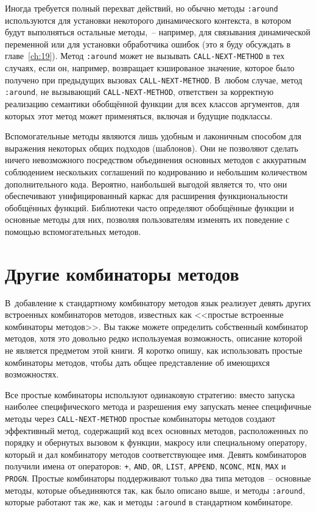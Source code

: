 Иногда требуется полный перехват действий, но обычно методы \lstinline{:around} используются
для установки некоторого динамического контекста, в котором будут выполняться остальные
методы,~-- например, для связывания динамической переменной или для установки обработчика
ошибок (это я буду обсуждать в главе~\ref{ch:19}).  Метод \lstinline{:around} может не вызывать
\lstinline{CALL-NEXT-METHOD} в тех случаях, если он, например, возвращает кэшированое значение,
которое было получено при предыдущих вызовах \lstinline{CALL-NEXT-METHOD}.  В~любом случае,
метод \lstinline{:around}, не вызывающий \lstinline{CALL-NEXT-METHOD}, ответствен за корректную
реа\-ли\-за\-цию семантики обобщённой функции для всех классов аргументов, для которых этот
метод может применяться, включая и будущие подклассы.

Вспомогательные методы являются лишь удобным и лаконичным способом для выражения некоторых
общих подходов (шаблонов).  Они не позволяют сделать ничего невозможного посредством
объединения основных методов с аккуратным соблюдением нескольких соглашений по кодированию
и небольшим количеством дополнительного кода. Вероятно, наибольшей выгодой является то,
что они обеспечивают унифицированный каркас для расширения функциональности обобщённых
функций.  Библиотеки часто определяют обобщённые функции и основные методы для них,
позволяя пользователям изменять их поведение с помощью вспомогательных методов.

\section{Другие комбинаторы методов}

В~добавление к стандартному комбинатору методов язык реализует девять других встроенных
комбинаторов методов, известных как <<простые встроенные комбинаторы методов>>.  Вы также
можете определить собственный комбинатор методов, хотя это довольно редко используемая
возможность, описание которой не является предметом этой книги.  Я коротко опишу, как
использовать простые комбинаторы методов, чтобы дать общее представление об имеющихся
возможностях.

Все простые комбинаторы используют одинаковую стратегию: вместо запуска наиболее
специфического метода и разрешения ему запускать менее специфичные методы через
\lstinline{CALL-NEXT-METHOD} простые комбинаторы методов создают эффективный метод, содержащий
код всех основных методов, расположенных по порядку и обернутых вызовом к функции,
макросу или специальному оператору, который и дал комбинатору методов соответствующее имя.
Девять комбинаторов получили имена от операторов: \lstinline{+}, \lstinline{AND}, \lstinline{OR},
\lstinline{LIST}, \lstinline{APPEND}, \lstinline{NCONC}, \lstinline{MIN}, \lstinline{MAX} и \lstinline{PROGN}.  Простые
комбинаторы поддерживают только два типа методов~-- основные методы, которые объединяются
так, как было описано выше, и методы \lstinline{:around}, которые работают так же, как и методы
\lstinline{:around} в стандартном комбинаторе.

